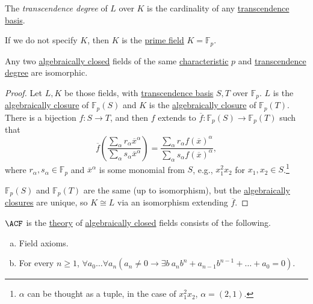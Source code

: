 \begin{definition}\label{def:transcendence-degree}
	The \emph{transcendence degree} of \(L\) over \(K\) is the cardinality of any \hyperref[def:transcendence-basis]{transcendence basis}.
\end{definition}

If we do not specify \(K\), then \(K\) is the \hyperref[def:prime-field]{prime field} \(K = \mathbb{F} _p\).

\begin{theorem}\label{thm:same-transcendence-degree-isomorphic}
	Any two \hyperref[def:algebraically-closed]{algebraically closed} fields of the same \hyperref[def:characteristic]{characteristic} \(p\) and \hyperref[def:transcendence-degree]{transcendence degree} are isomorphic.
\end{theorem}
\begin{proof}
	Let \(L, K\) be those fields, with \hyperref[def:transcendence-basis]{transcendence basis} \(S, T\) over \(\mathbb{F} _p\). \(L\) is the \hyperref[def:algebraically-closure]{algebraically closure} of \(\mathbb{F} _p(S)\) and \(K\) is the \hyperref[def:algebraically-closure]{algebraically closure} of \(\mathbb{F} _p(T)\). There is a bijection \(f\colon S\to T\), and then \(f\) extends to \(\overline{f} \colon \mathbb{F} _p(S) \to \mathbb{F} _p(T)\) such that
	\[
		\overline{f} \left( \frac{\sum_{\alpha } r_\alpha \overline{x} ^\alpha }{\sum_{\alpha }s_\alpha \overline{x} ^\alpha  } \right)
		= \frac{\sum_{\alpha } r_\alpha f(\overline{x} )^\alpha }{\sum_{\alpha } s_\alpha f(\overline{x} )^\alpha },
	\]
	where \(r_\alpha , s_\alpha \in \mathbb{F} _p\) and \(\overline{x} ^\alpha \) is some monomial from \(S\), e.g., \(x_1^2 x_2\) for \(x_1, x_2\in S\).\footnote{\(\alpha \) can be thought as a tuple, in the case of \(x_1^2 x_2\), \(\alpha = (2, 1)\).}

	\(\mathbb{F} _p(S)\) and \(\mathbb{F} _p(T)\) are the same (up to isomorphism), but the \hyperref[def:algebraically-closure]{algebraically closures} are unique, so \(K \cong L\) via an isomorphism extending \(\overline{f} \).
\end{proof}

\begin{definition}[\(\ACF\)]\label{def:ACF}
	\(\ACF\) is the \hyperref[def:theory]{theory} of \hyperref[def:algebraically-closed]{algebraically closed} fields consists of the following.
	\begin{enumerate}[(a)]
		\item Field axioms.
		\item For every \(n \geq 1\), \(\forall a_0 \ldots \forall a_n \left( a_n \neq 0 \to \exists b\ a_n b^n + a_{n-1} b^{n-1} + \ldots + a_0 = 0\right) \).
	\end{enumerate}
\end{definition}

